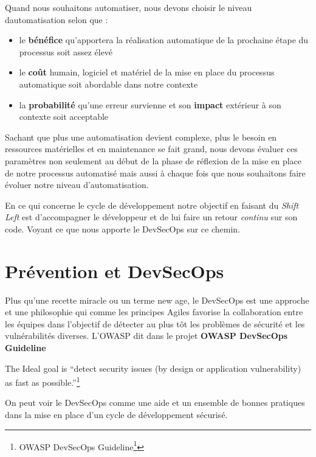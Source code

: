\documentclass[
  11pt,
  a4paper,
  krantz2,
  11pt,
  oneside]{krantz}
\renewenvironment{quote}{\begin{VF}}{\end{VF}}
\renewcommand{\href}[2]{#2\footnote{\url{#1}}}
\begin{document}
Quand nous souhaitons automatiser, nous devons choisir le niveau d\textquotesingle automatisation selon que :

\begin{itemize}
\item
  le \textbf{bénéfice} qu'apportera la réalisation automatique de la prochaine étape du processus soit assez élevé
\item
  le \textbf{coût} humain, logiciel et matériel de la mise en place du processus automatique soit abordable dans notre contexte
\item
  la \textbf{probabilité} qu'une erreur survienne et son \textbf{impact} extérieur à son contexte soit acceptable
\end{itemize}

Sachant que plus une automatisation devient complexe, plus le besoin en ressources matérielles et en maintenance se fait grand, nous devons évaluer ces paramètres non seulement au début de la phase de réflexion de la mise en place de notre processus automatisé mais aussi à chaque fois que nous souhaitons faire évoluer notre niveau d'automatisation.

En ce qui concerne le cycle de développement notre objectif en faisant du \emph{Shift Left} est d'accompagner le développeur et de lui faire un retour \emph{continu} sur son code. Voyant ce que nous apporte le DevSecOps sur ce chemin.

\section{Prévention et DevSecOps}\label{pruxe9vention-et-devsecops}

Plus qu'une recette miracle ou un terme new age, le DevSecOps est une approche et une philosophie qui comme les principes Agiles favorise la collaboration entre les équipes dans l'objectif de détecter au plus tôt les problèmes de sécurité et les vulnérabilités diverses. L'OWASP dit dans le projet \textbf{OWASP DevSecOps Guideline}

\begin{quote}
The Ideal goal is ``detect security issues (by design or application vulnerability) as fast as possible.''\footnote{\href{https://owasp.org/www-project-devsecops-guideline/}{OWASP DevSecOps Guideline}}
\end{quote}

On peut voir le DevSecOps comme une aide et un ensemble de bonnes pratiques dans la mise en place d'un cycle de développement sécurisé.
\end{document}
